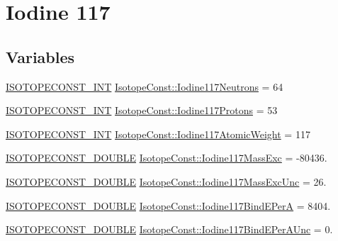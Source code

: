 \hypertarget{group___isotope_const-_iodine-_i117}{}\section{Iodine 117}
\label{group___isotope_const-_iodine-_i117}
\subsection*{Variables}
\begin{DoxyCompactItemize}
\item 
\mbox{\hyperlink{group___isotope_const-_macros_ga5f18360b3e99483a35c32d789e62621c}{I\+S\+O\+T\+O\+P\+E\+C\+O\+N\+S\+T\+\_\+\+I\+NT}} \mbox{\hyperlink{group___isotope_const-_iodine-_i117_ga2a07cd5ba9e402d61fe77eff790a07dd}{Isotope\+Const\+::\+Iodine117\+Neutrons}} = 64
\item 
\mbox{\hyperlink{group___isotope_const-_macros_ga5f18360b3e99483a35c32d789e62621c}{I\+S\+O\+T\+O\+P\+E\+C\+O\+N\+S\+T\+\_\+\+I\+NT}} \mbox{\hyperlink{group___isotope_const-_iodine-_i117_ga377285ac769b8fc963f09ff019b9f17b}{Isotope\+Const\+::\+Iodine117\+Protons}} = 53
\item 
\mbox{\hyperlink{group___isotope_const-_macros_ga5f18360b3e99483a35c32d789e62621c}{I\+S\+O\+T\+O\+P\+E\+C\+O\+N\+S\+T\+\_\+\+I\+NT}} \mbox{\hyperlink{group___isotope_const-_iodine-_i117_gafc993a5155680e148b9444ba1a75eaf2}{Isotope\+Const\+::\+Iodine117\+Atomic\+Weight}} = 117
\item 
\mbox{\hyperlink{group___isotope_const-_macros_ga8f45a7272ce02c0b4c65c44636ed719a}{I\+S\+O\+T\+O\+P\+E\+C\+O\+N\+S\+T\+\_\+\+D\+O\+U\+B\+LE}} \mbox{\hyperlink{group___isotope_const-_iodine-_i117_ga062f3025084944b362e614d034b4ab85}{Isotope\+Const\+::\+Iodine117\+Mass\+Exc}} = -\/80436.
\item 
\mbox{\hyperlink{group___isotope_const-_macros_ga8f45a7272ce02c0b4c65c44636ed719a}{I\+S\+O\+T\+O\+P\+E\+C\+O\+N\+S\+T\+\_\+\+D\+O\+U\+B\+LE}} \mbox{\hyperlink{group___isotope_const-_iodine-_i117_ga503b1f8c708c6276eaa5227c369462dc}{Isotope\+Const\+::\+Iodine117\+Mass\+Exc\+Unc}} = 26.
\item 
\mbox{\hyperlink{group___isotope_const-_macros_ga8f45a7272ce02c0b4c65c44636ed719a}{I\+S\+O\+T\+O\+P\+E\+C\+O\+N\+S\+T\+\_\+\+D\+O\+U\+B\+LE}} \mbox{\hyperlink{group___isotope_const-_iodine-_i117_ga3407ac364d6e0561440cfe6a773dbb57}{Isotope\+Const\+::\+Iodine117\+Bind\+E\+PerA}} = 8404.
\item 
\mbox{\hyperlink{group___isotope_const-_macros_ga8f45a7272ce02c0b4c65c44636ed719a}{I\+S\+O\+T\+O\+P\+E\+C\+O\+N\+S\+T\+\_\+\+D\+O\+U\+B\+LE}} \mbox{\hyperlink{group___isotope_const-_iodine-_i117_ga647381c9fc9faf5eee9c647777a729be}{Isotope\+Const\+::\+Iodine117\+Bind\+E\+Per\+A\+Unc}} = 0.

\end{DoxyCompactItemize}
